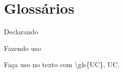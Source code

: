 \section{Glossários} 
\begin{frame}{Declarando}
	
\end{frame}

\begin{frame}{Fazendo uso}
	
Faça uso no texto com {\ttfamily \textbackslash gls\{UC\}}, \gls{UC}.

\end{frame}

\begin{frame}
	\printglossaries
\end{frame}